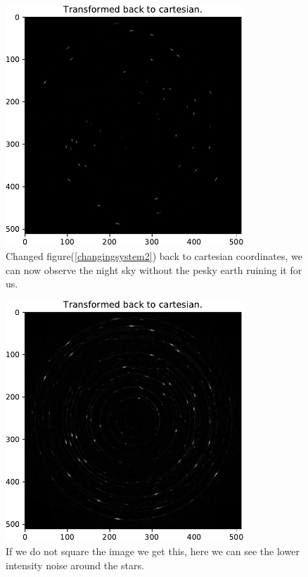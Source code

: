 {\begin{figure}[H]
    {\centering
        \includegraphics[width=0.8\textwidth]{carttopol_trans_back3.pdf}
        \caption{Changed figure(\ref{changingsystem2}) back to cartesian coordinates, we can now observe the night sky without the pesky earth ruining it for us.}
        \label{changingsystem3}
    \par}
    \end{figure}
    

    \begin{figure}[H]
        {\centering
            \includegraphics[width=0.8\textwidth]{carttopol_trans_back_original.pdf}
            \caption{If we do not square the image we get this, here we can see the lower intensity noise around the stars.}
            \label{changingsystemorignal}
        \par}
        \end{figure}
        




}
